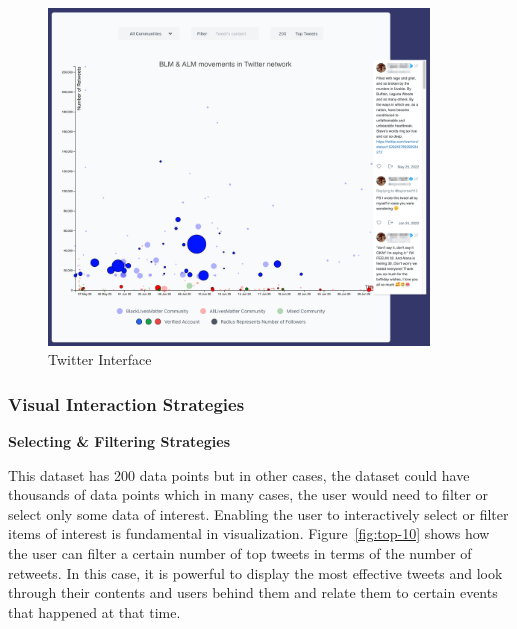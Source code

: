 \begin{figure}[H]
\centering
\captionsetup{justification=centering}
\includegraphics[width=0.9\textwidth]{./pics/twitter.png}
\caption{Twitter Interface}
\label{fig:e-twitter}
\end{figure}


\subsubsection{Visual Interaction Strategies}

\textbf{Selecting \& Filtering Strategies}

This dataset has 200 data points but in other cases, the dataset could have thousands of data points which in many cases, the user would need to filter or select only some data of interest. Enabling the user to interactively select or filter items of interest is fundamental in visualization. Figure~\ref{fig:top-10} shows how the user can filter a certain number of top tweets in terms of the number of retweets. In this case, it is powerful to display the most effective tweets and look through their contents and users behind them and relate them to certain events that happened at that time. 

